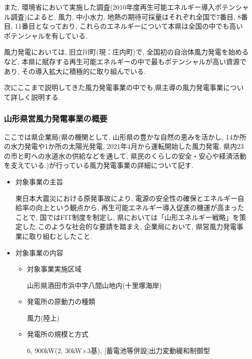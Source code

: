 \documentclass[dvipdfmx]{jsarticle}
\begin{document}
また, 環境省において実施した調査(2010年度再生可能エネルギー導入ポテンシャル調査)によると, 風力, 中小水力, 地熱の期待可採量はそれぞれ全国で7番目, 8番目, 11番目となっており, これらのエネルギーについて本県は全国の中でも高いポテンシャルを有している.

風力発電においては, 旧立川町(現：庄内町)で, 全国初の自治体風力発電を始めるなど, 本県に賦存する再生可能エネルギーの中で最もポテンシャルが高い資源であり, その導入拡大に積極的に取り組んでいる.

次にここまで説明してきた風力発電事業の中でも,県主導の風力発電事業について詳しく説明する.

\subsubsection{山形県営風力発電事業の概要}
ここでは県企業局(県の機関として, 山形県の豊かな自然の恵みを活かし, 14か所の水力発電や1か所の太陽光発電, 2021年4月から運転開始した風力発電, 県内23の市と町への水道水の供給などを通して, 県民のくらしの安全・安心や経済活動を支えている.)が行っている風力発電事業の詳細について記す.
\begin{itemize}
    \item 対象事業の主旨

    東日本大震災における原発事故により, 電源の安全性の確保とエネルギー自給率の向上という観点から, 再生可能エネルギー導入促進の機運が高まったことで, 国ではFIT制度を制定し, 県においては「山形エネルギー戦略」を策定した.このような社会的な要請を踏まえ, 企業局において, 県営風力発電事業に取り組むとしたこと.

    \item 対象事業の内容
    \begin{itemize}
        \item 対象事業実施区域
        
        山形県酒田市浜中字八間山地内(十里塚海岸)
        \item 発電所の原動力の種類
        
        風力(陸上)
        \item 発電所の規模と方式
        
        6, 900kW(2, 30kW×3基), [蓄電池等併設]出力変動緩和制御型
    \end{itemize}    

\end{itemize}
\end{document}
